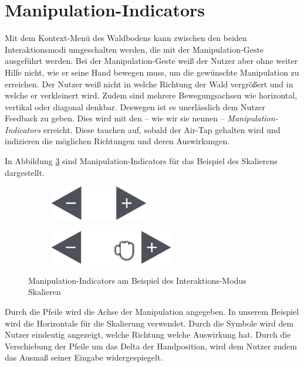\section{Manipulation-Indicators}
\label{subsec:Manipulation-Indicators}
Mit dem Kontext-Menü des Waldbodens kann zwischen den beiden Interaktionsmodi umgeschalten werden, die mit der Manipulation-Geste ausgeführt werden. Bei der Manipulation-Geste weiß der Nutzer aber ohne weiter Hilfe nicht, wie er seine Hand bewegen muss, um die gewünschte Manipulation zu erreichen. Der Nutzer weiß nicht in welche Richtung der Wald vergrößert und in welche er verkleinert wird. Zudem sind mehrere Bewegungsachsen wie horizontal, vertikal oder diagonal denkbar. Deswegen ist es unerlässlich dem Nutzer Feedback zu geben. Dies wird mit den -- wie wir sie nennen -- \textit{Manipulation-Indicators} erreicht. Diese tauchen auf, sobald der Air-Tap gehalten wird und indizieren die möglichen Richtungen und deren Auswirkungen.

In Abbildung \ref{fig:manipulation} sind Manipulation-Indicators für das Beispiel des Skalierens dargestellt.

\begin{figure}[htb]
  \centering
  \begin{subfigure}[t]{\fwidth}
    \centering
    \includegraphics[height=1.5cm]{figures/manipulation}
     \label{fig:manipulation}
  \end{subfigure}
  \begin{subfigure}[t]{\fwidth}
    \centering
  	\includegraphics[height=1.5cm]{figures/manipulation-drag}
  	 \label{fig:manipulation-drag}
  \end{subfigure}
  \caption{Manipulation-Indicators am Beispiel des Interaktions-Modus Skalieren} \label{fig:manipulation}
\end{figure}

Durch die Pfeile wird die Achse der Manipulation angegeben. In unserem Beispiel wird die Horizontale für die Skalierung verwendet. Durch die Symbole wird dem Nutzer eindeutig angezeigt, welche Richtung welche Auswirkung hat. Durch die Verschiebung der Pfeile um das Delta der Handposition, wird dem Nutzer zudem das Ausmaß seiner Eingabe widergespiegelt.

